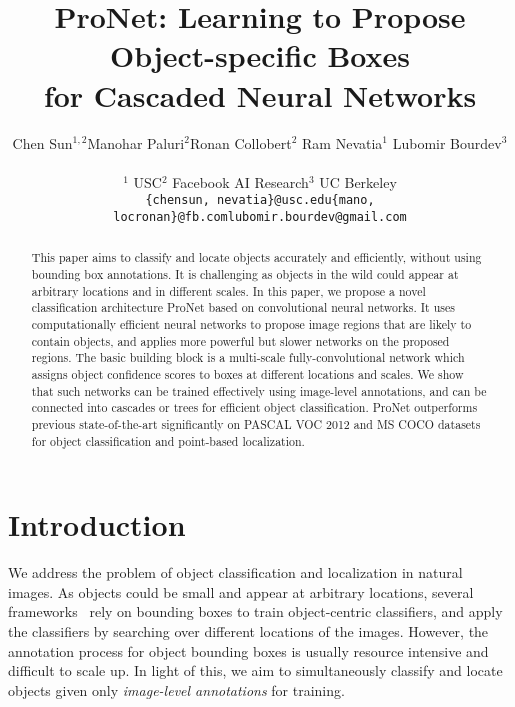 \documentclass[10pt,twocolumn,letterpaper]{article}
\begin{document}
\title{ProNet: Learning to Propose Object-specific Boxes\\ for Cascaded Neural Networks}

\author{Chen Sun$^{1,2}$\quad Manohar Paluri$^2$\quad Ronan Collobert$^2$
       \quad Ram Nevatia$^1$ \quad Lubomir Bourdev$^3$
       \\
       \begin{tabular}{ccc}
       $^1$ USC & $^2$ Facebook AI Research & $^3$ UC Berkeley\\
        {\tt\small\{chensun, nevatia\}@usc.edu} & {\tt\small\{mano, locronan\}@fb.com} & {\tt\small lubomir.bourdev@gmail.com}
       \end{tabular}
       }

\maketitle

\begin{abstract}
This paper aims to classify and locate objects accurately and efficiently, without using bounding box annotations. It is challenging as objects in the wild could appear at arbitrary locations and in different scales. 
In this paper, we propose a novel classification architecture ProNet based on convolutional neural networks. 
It uses computationally efficient neural networks to propose image regions that are likely to contain objects, and applies more powerful but slower networks on the proposed regions. The basic building block is a multi-scale fully-convolutional network which assigns object confidence scores to boxes at different locations and scales. We show that such networks can be trained effectively using image-level annotations, and can be connected into cascades or trees for efficient object classification. ProNet outperforms previous state-of-the-art significantly on PASCAL VOC 2012 and MS COCO datasets for object classification and point-based localization.
\end{abstract}




\section{Introduction}


We address the problem of object classification and localization in natural images. As objects could be small and appear at arbitrary locations, several frameworks~\cite{DBLP:conf/cvpr/OquabBLS14,NUS-PSL} rely on bounding boxes to train object-centric classifiers, and apply the classifiers by searching over different locations of the images. However, the annotation process for object bounding boxes is usually resource intensive and difficult to scale up. In light of this, we aim to simultaneously classify and locate objects given only \textit{image-level annotations} for training.
\end{document}
